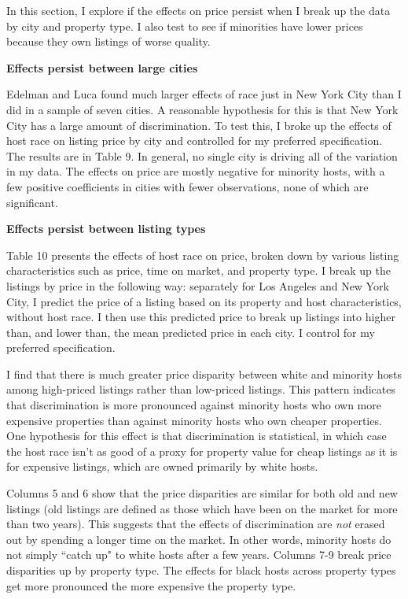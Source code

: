 
In this section, I explore if the effects on price persist when I break up the data by city and property type. I also test to see if minorities have lower prices because they own listings of worse quality. 

\textbf{Effects persist between large cities}

Edelman and Luca found much larger effects of race just in New York City than I did in a sample of seven cities. A reasonable hypothesis for this is that New York City has a large amount of discrimination. To test this, I broke up the effects of host race on listing price by city and controlled for my preferred specification. The results are in Table 9. In general, no single city is driving all of the variation in my data. The effects on price are mostly negative for minority hosts, with a few positive coefficients in cities with fewer observations, none of which are significant. 


\textbf{Effects persist between listing types}

Table 10 presents the effects of host race on price, broken down by various listing characteristics such as price, time on market, and property type. I break up the listings by price in the following way: separately for Los Angeles and New York City, I predict the price of a listing based on its property and host characteristics, without host race. I then use this predicted price to break up listings into higher than, and lower than, the mean predicted price in each city. I control for my preferred specification.  

I find that there is much greater price disparity between white and minority hosts among high-priced listings rather than low-priced listings. This pattern indicates that discrimination is more pronounced against minority hosts who own more expensive properties than against minority hosts who own cheaper properties. One hypothesis for this effect is that discrimination is statistical, in which case the host race isn't as good of a proxy for property value for cheap listings as it is for expensive listings, which are owned primarily by white hosts. 

Columns 5 and 6 show that the price disparities are similar for both old and new listings (old listings are defined as those which have been on the market for more than two years). This suggests that the effects of discrimination are \textit{not} erased out by spending a longer time on the market. In other words, minority hosts do not simply ``catch up" to white hosts after a few years. Columns 7-9 break price disparities up by property type. The effects for black hosts across property types get more pronounced the more expensive the property type. 


